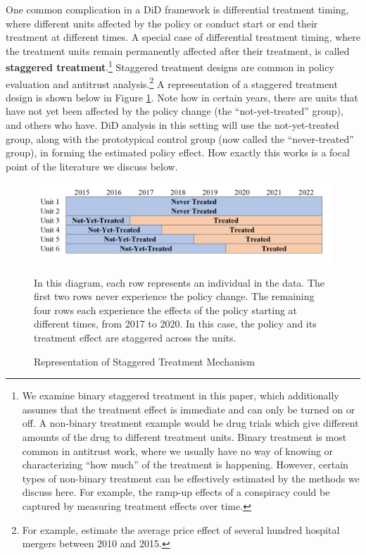 \documentclass[12pt]{article}
\begin{document}
One common complication in a DiD framework is differential treatment timing, where different units affected by the policy or conduct start or end their treatment at different times. A special case of differential treatment timing, where the treatment units remain permanently affected after their treatment, is called \textbf{staggered treatment}.\footnote{We examine binary staggered treatment in this paper, which additionally assumes that the treatment effect is immediate and can only be turned on or off. A non-binary treatment example would be drug trials which give different amounts of the drug to different treatment units. Binary treatment is most common in antitrust work, where we usually have no way of knowing or characterizing “how much” of the treatment is happening. However, certain types of non-binary treatment can be effectively estimated by the methods we discuss here. For example, the ramp-up effects of a conspiracy could be captured by measuring treatment effects over time.}  Staggered treatment designs are common in policy evaluation and antitrust analysis.\footnote{For example, \citet{brot2024toolittle} estimate the average price effect of several hundred hospital mergers between 2010 and 2015.} A representation of a staggered treatment design is shown below in Figure \ref{fig:visual}. Note how in certain years, there are units that have not yet been affected by the policy change (the “not-yet-treated” group), and others who have. DiD analysis in this setting will use the not-yet-treated group, along with the prototypical control group (now called the “never-treated” group), in forming the estimated policy effect. How exactly this works is a focal point of the literature we discuss below.
\begin{figure}[H]
    \centering
    \caption{Representation of Staggered Treatment Mechanism}
    \includegraphics[width=5in]{Figures/Visual Staggered Treatment.PNG}
    \label{fig:visual}
    \vspace{2mm}
    \footnotesize \begin{singlespace*}
        \parbox{5.5in}{In this diagram, each row represents an individual in the data. The first two rows never experience the policy change. The remaining four rows each experience the effects of the policy starting at different times, from 2017 to 2020. In this case, the policy and its treatment effect are staggered across the units.}
    \end{singlespace*}
\end{figure}
\end{document}
